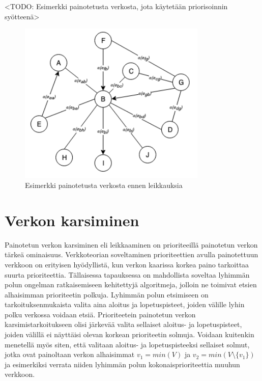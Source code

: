   <TODO: Esimerkki painotetusta verkosta, jota käytetään priorisoinnin syötteenä>
  \begin{figure}[H]
    \centering
    \includegraphics[width=0.8\textwidth]{assets/painotettu-verkko-ennen.png}
    \caption{Esimerkki painotetusta verkosta ennen leikkauksia}
    \label{fig:painotettu-verkko-ennen}
  \end{figure}

\section{Verkon karsiminen} \label{ch:10_verkon_karsiminen}

  Painotetun verkon karsiminen eli leikkaaminen on prioriteeillä painotetun verkon tärkeä ominaisuus.
  Verkkoteorian soveltaminen prioriteettien avulla painotettuun verkkoon on erityisen hyödyllistä, kun verkon kaarissa korkea paino tarkoittaa suurta prioriteettia.
  Tällaisessa tapauksessa on mahdollista soveltaa lyhimmän polun ongelman ratkaisemiseen kehitettyjä algoritmeja, jolloin ne toimivat etsien alhaisimman prioriteetin polkuja.
  Lyhimmän polun etsimiseen on tarkoituksenmukaista valita aina aloitus ja lopetuspisteet, joiden välille lyhin polku verkossa voidaan etsiä.
  Prioriteetein painotetun verkon karsimistarkoitukseen olisi järkevää valita sellaiset aloitus- ja lopetuspisteet, joiden välillä ei näyttäisi olevan korkean prioriteetin solmuja.
  Voidaan kuitenkin menetellä myös siten, että valitaan aloitus- ja lopetuspisteeksi sellaiset solmut, jotka ovat painoltaan verkon alhaisimmat \(v_1 = min(V)\) ja \(v_2 = min(V \setminus \{v_1\})\) ja esimerkiksi verrata niiden lyhimmän polun kokonaisprioriteettia muuhun verkkoon.

